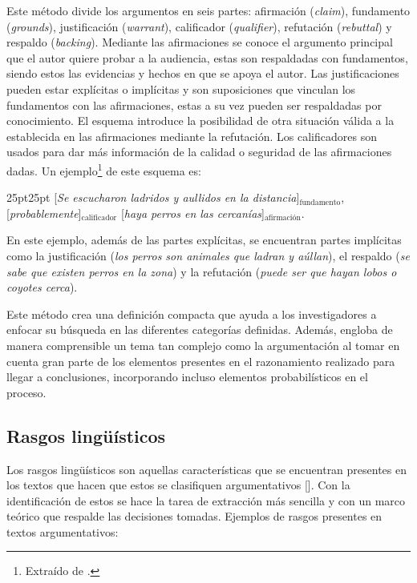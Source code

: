 Este método divide los argumentos en seis partes: afirmación 
(\emph{claim}), fundamento (\emph{grounds}), justificación (\emph{warrant}), calificador 
(\emph{qualifier}), refutación (\emph{rebuttal}) y respaldo (\emph{backing}).
Mediante las afirmaciones se conoce el argumento principal que el autor quiere probar a la audiencia,
estas son respaldadas con fundamentos, siendo estos las evidencias y hechos en que se apoya el autor.
Las justificaciones pueden estar explícitas o implícitas y son suposiciones que vinculan los
fundamentos con las afirmaciones, estas a su vez pueden ser respaldadas por conocimiento.
El esquema introduce la posibilidad de otra situación válida a la establecida en las afirmaciones
mediante la refutación. Los calificadores son usados para dar más información de la calidad o seguridad
de las afirmaciones dadas. Un ejemplo\footnote{Extraído de 
\textcite{toulminArgument}.
} de este esquema es:

\begin{adjustwidth}{25pt}{25pt}
    [\emph{Se escucharon ladridos y aullidos en la distancia}]$_{\mathrm{fundamento}}$, 
    [\emph{probablemente}]$_{\mathrm{calificador}}$ 
    [\emph{haya perros en las cercanías}]$_{\mathrm{afirmación}}$.
\end{adjustwidth}

En este ejemplo, además de las partes explícitas, se encuentran partes implícitas como la justificación 
(\emph{los perros son animales que ladran y aúllan}), el respaldo (\emph{se sabe que existen perros en la zona}) y 
la refutación (\emph{puede ser que hayan lobos o coyotes cerca}).

Este método crea una definición compacta que ayuda a los investigadores a enfocar su búsqueda 
en las diferentes categorías definidas. Además, engloba de manera comprensible un tema tan complejo 
como la argumentación al tomar en cuenta gran parte de los elementos presentes en el razonamiento
realizado para llegar a conclusiones, incorporando incluso elementos probabilísticos en el proceso. 

\subsection{Rasgos lingüísticos}

Los rasgos lingüísticos son aquellas características que se encuentran presentes en los textos 
que hacen que estos se clasifiquen argumentativos [\cite{venegas2005hacia}]. Con 
la identificación de estos se hace la tarea de extracción más sencilla y con un marco teórico 
que respalde las decisiones tomadas. Ejemplos de rasgos presentes en textos argumentativos:

